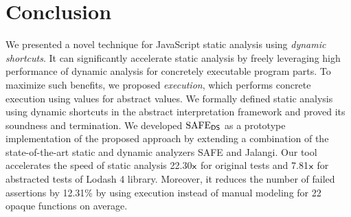 \section{Conclusion}\label{sec:conclusion}
We presented a novel technique for JavaScript static analysis using \textit{dynamic shortcuts}.
It can significantly accelerate static
analysis by freely leveraging high performance of dynamic analysis for
concretely executable program parts.  To maximize such benefits,
we proposed \textit{{\sealed} execution}, which performs
concrete execution using {\sealed} values for abstract values.
We formally defined static analysis using dynamic shortcuts in the
abstract interpretation framework and proved its soundness and termination.
We developed $\text{SAFE}_{\textsf{DS}}$ as a prototype implementation of the proposed approach
by extending a combination of the state-of-the-art static and dynamic
analyzers SAFE and Jalangi.  Our tool accelerates the speed
of static analysis 22.30${\textsf{x}}$ for original tests and 7.81${\textsf{x}}$ for
abstracted tests of Lodash 4 library.  Moreover, it reduces the number
of failed assertions by 12.31\% by using {\sealed} execution instead of
manual modeling for 22 opaque functions on average.
